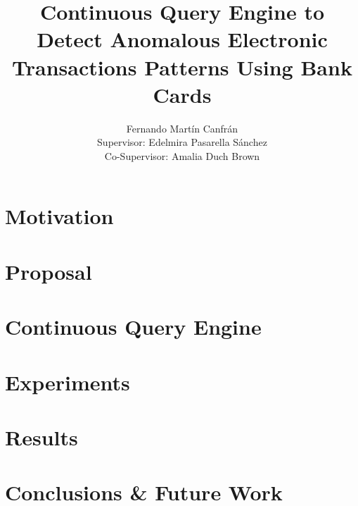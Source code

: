 \documentclass{beamer}
\title[CQE Anomalous ATM Transactions] %
{Continuous Query Engine to Detect Anomalous Electronic Transactions Patterns Using Bank Cards}
\author[F. Martín Canfrán] %
{Fernando Martín Canfrán\\[0.5cm] 
\small Supervisor: Edelmira Pasarella Sánchez\\
\small Co-Supervisor: Amalia Duch Brown}
\institute[UPC] %
{
  Facultat d'Informàtica de Barcelona\\
  Universitat Politècnica de Catalunya
}
\date[\monthyeardate\today] %
\begin{document}
\frame{\titlepage}

\begin{comment}
\begin{frame}{Overview}
  \tableofcontents
\end{frame}
\end{comment}




\section{Motivation}


\section{Proposal}


\section{Continuous Query Engine}


\section{Experiments}


\section{Results}


\section{Conclusions \& Future Work}

\end{document}
